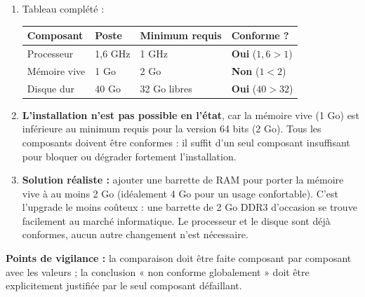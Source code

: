 \documentclass[11pt]{article}
\begin{document}
\begin{corrige}
\begin{enumerate}
\item Tableau complété :
\begin{center}
\begin{tabularx}{\linewidth}{|l|X|X|X|}
\hline
\rowcolor{popblueL} \textbf{Composant} & \textbf{Poste} & \textbf{Minimum requis} & \textbf{Conforme ?} \\
\hline
Processeur & 1,6 GHz & 1 GHz & \textbf{Oui} ($1,6 > 1$) \\
\hline
Mémoire vive & 1 Go & 2 Go & \textbf{Non} ($1 < 2$) \\
\hline
Disque dur & 40 Go & 32 Go libres & \textbf{Oui} ($40 > 32$) \\
\hline
\end{tabularx}
\end{center}
\item \textbf{L'installation n'est pas possible en l'état}, car la mémoire vive (1 Go) est inférieure au minimum requis pour la version 64 bits (2 Go). Tous les composants doivent être conformes : il suffit d'un seul composant insuffisant pour bloquer ou dégrader fortement l'installation.
\item \textbf{Solution réaliste :} ajouter une barrette de RAM pour porter la mémoire vive à au moins 2 Go (idéalement 4 Go pour un usage confortable). C'est l'upgrade le moins coûteux : une barrette de 2 Go DDR3 d'occasion se trouve facilement au marché informatique. Le processeur et le disque sont déjà conformes, aucun autre changement n'est nécessaire.
\end{enumerate}
\textbf{Points de vigilance :} la comparaison doit être faite composant par composant avec les valeurs ; la conclusion « non conforme globalement » doit être explicitement justifiée par le seul composant défaillant.
\end{corrige}
\end{document}
